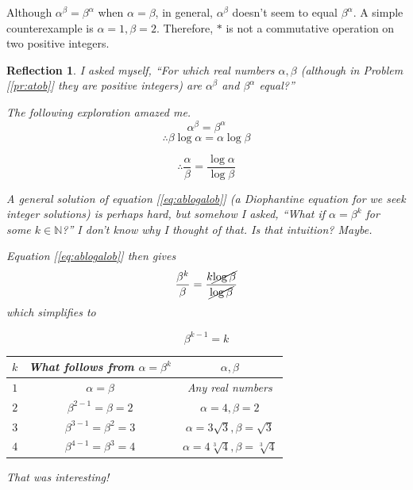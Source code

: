 \documentclass[english,notitlepage,smartquotes]{hgbreport}
\theoremstyle{definition}
\theoremstyle{problem}
\theoremstyle{remark}
\theoremstyle{plain}
\newtheorem{reflection}{Reflection}
\begin{document}
Although $\alpha^\beta=\beta^\alpha$ when $\alpha=\beta$, in general, $\alpha^{\beta}$ doesn't seem to equal $\beta^\alpha$. A simple counterexample is $\alpha=1,\beta=2$. Therefore, $*$ is not a commutative operation on two positive integers.
\begin{reflection}

I asked myself, ``For which real numbers $\alpha,\beta$ (although in Problem [\ref{pr:atob}] they are positive integers) are $\alpha^\beta$ and $\beta^\alpha$ equal?''

The following exploration amazed me.
$$
\alpha^\beta=\beta^\alpha
$$
\begin{equation}
\label{eq:takelogs}
\therefore \beta\log\alpha=\alpha\log\beta
\end{equation}

\begin{equation}
\label{eq:ablogalob}
\therefore \frac{\alpha}{\beta}=\frac{\log\alpha}{\log\beta}
\end{equation}

A general solution of equation [\ref{eq:ablogalob}] (a Diophantine equation for we seek integer solutions) is perhaps hard, but somehow I asked, ``What if $\alpha=\beta^k$ for some $k\in\mathbb N$?'' I don't know why I thought of that. Is that intuition? Maybe.

Equation [\ref{eq:ablogalob}] then gives
$$
\frac{\beta^k}{\beta}=\frac{k\cancel{\log\beta}}{\cancel{\log\beta}}
$$
which simplifies to

\begin{equation}
\label{eq:bk-1k}
\beta^{k-1}=k
\end{equation}


\begin{tabular}{|c|c|c|}
 \hline
 $k$ & What follows from $\alpha=\beta^k$ & $\alpha,\beta$ \\ \hline
 \hline
 $1$ & $\alpha=\beta$  & Any real numbers \\ \hline
 $2$ & $\beta^{2-1}=\beta=2$ & $\alpha=4,\beta=2$ \\ \hline
 $3$ & $\beta^{3-1}=\beta^2=3$ & $\alpha=3\sqrt{3},\beta=\sqrt{3}$ \\ \hline
 $4$ & $\beta^{4-1}=\beta^3=4$ & $\alpha=4\sqrt[3]{4},\beta=\sqrt[3]{4}$ \\ \hline
\end{tabular}


That was interesting! 

\end{reflection}
\end{document}
